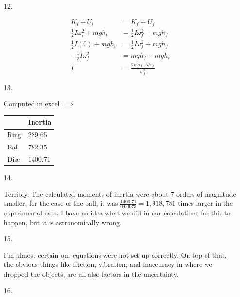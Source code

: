 \begin{itemize}
        \item[12.]
        
        \begin{align*}
            K_{i} + U_{i}               
            & = K_{f} + U_{f}                           \\
            \frac{1}{2}I\omega^{2}_{i} + mgh_{i} 
            & = \frac{1}{2}I\omega^{2}_{f} + mgh_{f}    \\
            \frac{1}{2}I(0) + mgh_{i}
            & = \frac{1}{2}I\omega^{2}_{f} + mgh_{f}    \\
            -\frac{1}{2}I\omega^{2}_{f}
            & = mgh_{f} - mgh_{i}                       \\
            I
            & = \frac{2mg(\Delta h)}{\omega^{2}_{f}}
        \end{align*}

        \item[13.]~\\
              
        \begin{center}
            Computed in excel $\implies$ 
            \begin{tabular}{l | l}
                & Inertia             \\ \hline
                Ring        & 289.65  \\ \hline
                Ball        & 782.35  \\ \hline
                Disc        & 1400.71
            \end{tabular}
        \end{center}

        \item[14.]
        
        Terribly. The calculated moments of inertia were about 7 orders of magnitude smaller, for the case of the ball, it was $\frac{1400.71}{0.00073} = 1,918,781$ times larger in the experimental case. I have no idea what we did in our calculations for this to happen, but it is astronomically wrong.

        \item[15.]
        
        I'm almost certain our equations were not set up correctly. On top of that, the obvious things like friction, vibration, and inaccuracy in where we dropped the objects, are all also factors in the uncertainty.

        \item [16.]
        

\end{itemize}
